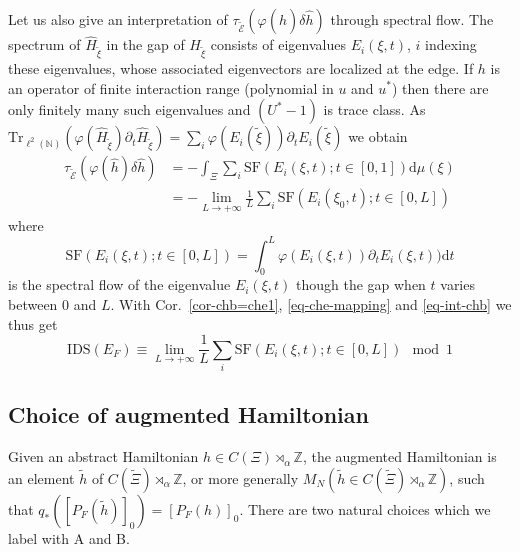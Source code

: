 \documentclass[11pt]{amsart}
\newcommand{\Z}{\mathbb{Z}}
\newcommand{\N}{\mathbb{N}}
\begin{document}
Let us also give an interpretation of $\tau_{\tilde{\mathcal  E}}(\varphi(\hat h)\delta \hat h) $ through spectral flow. The spectrum of $\hat H_{\tilde\xi}$ in the gap of 
$H_{\tilde\xi}$ consists of eigenvalues $E_i(\xi,t)$, $i$ indexing these eigenvalues, whose associated eigenvectors are localized at the edge. If $h$ is an operator of finite interaction range (polynomial in $u$ and $u^*$) then there are only finitely many such eigenvalues and $(U^*-1)$ 
is trace class. As 
$\mathrm{Tr}_{\ell^2(\N)}(\varphi(\hat H_{\tilde\xi})\partial_t \hat H_{\tilde\xi} ) = \sum_i \varphi(E_i({\tilde\xi}))\partial_t E_i({\tilde\xi})$ we obtain
\begin{align*}\tau_{\tilde{\mathcal  E}}(\varphi(\hat h)\delta \hat h)  & = - \int_{\Xi}\sum_i\mathrm{SF}(E_i(\xi,t);t\in [0,1]) \mathrm{d}\mu(\xi)\\
& = -\lim_{L\to +\infty} \frac1{L} \sum_i\mathrm{SF}(E_i(\xi_0,t);t\in [0,L])\end{align*}
where
$$\mathrm{SF}(E_i(\xi,t);t\in [0,L]) = \int_0^L\varphi(E_i({\xi,t}))\partial_t E_i({\xi,t})) \mathrm{d} t $$
is the spectral flow of the eigenvalue $E_i(\xi,t)$ though the gap when $t$ varies between $0$ and $L$. With Cor.~\ref{cor-chb=che1}, \eqref{eq-che-mapping} and \eqref{eq-int-chb} we thus get
\begin{equation}\label{eq-che-mapping-int}
\mathrm{IDS}(E_F)  
\equiv \lim_{L\to +\infty} \frac1{L}\sum_i \mathrm{SF}(E_i(\xi,t);t\in [0,L])
\mod{1}
\end{equation}



\subsection{Choice of augmented Hamiltonian}
Given an abstract Hamiltonian $h\in C(\Xi)\rtimes_\alpha\Z$, the augmented Hamiltonian is an element $\tilde h$ of $C(\tilde\Xi)\rtimes_\alpha\Z$, or more generally $M_N(\tilde h\in C(\tilde\Xi)\rtimes_\alpha\Z)$, such that $q_*([P_F(\tilde h)]_0)=[P_F(h)]_0$. 
There are two natural choices which we label with A and B.
\end{document}
